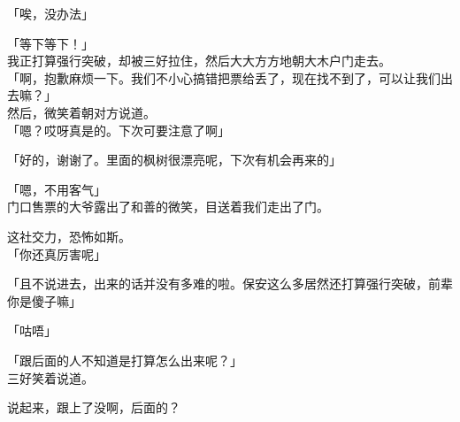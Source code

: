 「唉，没办法」

「等下等下！」\\

我正打算强行突破，却被三好拉住，然后大大方方地朝大木户门走去。\\

「啊，抱歉麻烦一下。我们不小心搞错把票给丢了，现在找不到了，可以让我们出去嘛？」\\

然后，微笑着朝对方说道。\\

「嗯？哎呀真是的。下次可要注意了啊」

「好的，谢谢了。里面的枫树很漂亮呢，下次有机会再来的」

「嗯，不用客气」\\

门口售票的大爷露出了和善的微笑，目送着我们走出了门。

这社交力，恐怖如斯。\\

「你还真厉害呢」

「且不说进去，出来的话并没有多难的啦。保安这么多居然还打算强行突破，前辈你是傻子嘛」

「咕唔」

「跟后面的人不知道是打算怎么出来呢？」\\

三好笑着说道。

说起来，跟上了没啊，后面的？\\

